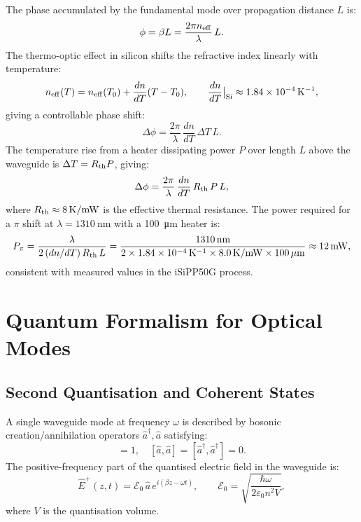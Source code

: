 \documentclass[12pt, a4paper]{article}
\begin{document}
The phase accumulated by the fundamental mode over propagation distance $L$ is:
\begin{equation}
  \phi = \beta L = \frac{2\pi n_{\rm eff}}{\lambda}\,L.
  \label{eq:phase_accumulation}
\end{equation}
The thermo-optic effect in silicon shifts the refractive index linearly with
temperature:
\begin{equation}
  n_{\rm eff}(T) = n_{\rm eff}(T_0) + \frac{dn}{dT}(T - T_0),
  \qquad \frac{dn}{dT}\big|_{\rm Si} \approx 1.84\times10^{-4}\,\mathrm{K}^{-1},
  \label{eq:thermo_optic}
\end{equation}
giving a controllable phase shift:
\begin{equation}
  \Delta\phi = \frac{2\pi}{\lambda}\,\frac{dn}{dT}\,\Delta T\,L.
  \label{eq:delta_phi_T}
\end{equation}
The temperature rise from a heater dissipating power $P$ over length $L$ above
the waveguide is $\Delta T = R_{\rm th} P$, giving:
\begin{equation}
  \Delta\phi = \frac{2\pi}{\lambda}\,\frac{dn}{dT}\,R_{\rm th}\,P\,L,
  \label{eq:delta_phi_P}
\end{equation}
where $R_{\rm th}\approx 8\,\mathrm{K/mW}$ is the effective thermal resistance.
The power required for a $\pi$ shift at $\lambda=\SI{1310}{\nano\metre}$
with a \SI{100}{\micro\metre} heater is:
\begin{equation}
  P_\pi
  = \frac{\lambda}{2\,(dn/dT)\,R_{\rm th}\,L}
  = \frac{1310\,\mathrm{nm}}{2\times1.84\times10^{-4}\,\mathrm{K}^{-1}
    \times 8.0\,\mathrm{K/mW}\times 100\,\mathrm{\mu m}}
  \approx 12\,\mathrm{mW},
  \label{eq:P_pi}
\end{equation}
consistent with measured values in the iSiPP50G process.

\section{Quantum Formalism for Optical Modes}
\label{sec:quantum}

\subsection{Second Quantisation and Coherent States}

A single waveguide mode at frequency $\omega$ is described by bosonic
creation/annihilation operators $\hat{a}^\dagger, \hat{a}$ satisfying:
\begin{equation}
  [\hat{a},\hat{a}^\dagger] = 1, \quad
  [\hat{a},\hat{a}] = [\hat{a}^\dagger,\hat{a}^\dagger] = 0.
  \label{eq:boson_commutator}
\end{equation}
The positive-frequency part of the quantised electric field in the waveguide is:
\begin{equation}
  \hat{E}^+(z,t) = \mathcal{E}_0\,\hat{a}\,e^{i(\beta z - \omega t)},
  \qquad
  \mathcal{E}_0 = \sqrt{\frac{\hbar\omega}{2\varepsilon_0 n^2 V}},
  \label{eq:field_quantised}
\end{equation}
where $V$ is the quantisation volume.
\end{document}
